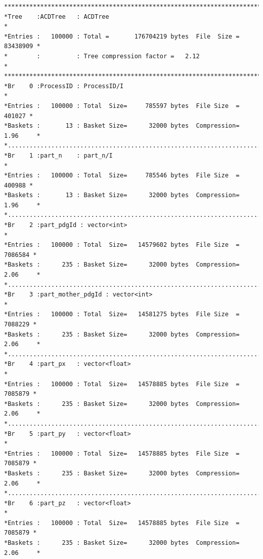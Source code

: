 {\scriptsize
\begin{verbatim}  
******************************************************************************
*Tree    :ACDTree   : ACDTree                                                *
*Entries :   100000 : Total =       176704219 bytes  File  Size =   83438909 *
*        :          : Tree compression factor =   2.12                       *
******************************************************************************
*Br    0 :ProcessID : ProcessID/I                                            *
*Entries :   100000 : Total  Size=     785597 bytes  File Size  =     401027 *
*Baskets :       13 : Basket Size=      32000 bytes  Compression=   1.96     *
*............................................................................*
*Br    1 :part_n    : part_n/I                                               *
*Entries :   100000 : Total  Size=     785546 bytes  File Size  =     400988 *
*Baskets :       13 : Basket Size=      32000 bytes  Compression=   1.96     *
*............................................................................*
*Br    2 :part_pdgId : vector<int>                                           *
*Entries :   100000 : Total  Size=   14579602 bytes  File Size  =    7086584 *
*Baskets :      235 : Basket Size=      32000 bytes  Compression=   2.06     *
*............................................................................*
*Br    3 :part_mother_pdgId : vector<int>                                    *
*Entries :   100000 : Total  Size=   14581275 bytes  File Size  =    7088229 *
*Baskets :      235 : Basket Size=      32000 bytes  Compression=   2.06     *
*............................................................................*
*Br    4 :part_px   : vector<float>                                          *
*Entries :   100000 : Total  Size=   14578885 bytes  File Size  =    7085879 *
*Baskets :      235 : Basket Size=      32000 bytes  Compression=   2.06     *
*............................................................................*
*Br    5 :part_py   : vector<float>                                          *
*Entries :   100000 : Total  Size=   14578885 bytes  File Size  =    7085879 *
*Baskets :      235 : Basket Size=      32000 bytes  Compression=   2.06     *
*............................................................................*
*Br    6 :part_pz   : vector<float>                                          *
*Entries :   100000 : Total  Size=   14578885 bytes  File Size  =    7085879 *
*Baskets :      235 : Basket Size=      32000 bytes  Compression=   2.06     *

\end{verbatim}}
